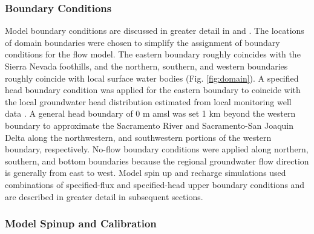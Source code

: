 \subsubsection{Boundary Conditions} \label{ssec:MM_BCs}
Model boundary conditions are discussed in greater detail in \cite{liu2014thesis} and \cite{maples_2019}. The locations of domain boundaries were chosen to simplify the assignment of boundary conditions for the flow model. The eastern boundary roughly coincides with the Sierra Nevada foothills, and the northern, southern, and western boundaries roughly coincide with local surface water bodies (Fig. \ref{fig:domain}). A specified head boundary condition was applied for the eastern boundary to coincide with the local groundwater head distribution estimated from local monitoring well data \citep{liu2014thesis}. A general head boundary of 0 m amsl was set 1 km beyond the western boundary to approximate the Sacramento River and Sacramento-San Joaquin Delta along the northwestern, and southwestern portions of the western boundary, respectively. No-flow boundary conditions were applied along northern, southern, and bottom boundaries because the regional groundwater flow direction is generally from east to west. Model spin up and recharge simulations used combinations of specified-flux and specified-head upper boundary conditions and are described in greater detail in subsequent sections.

\subsubsection{Model Spinup and Calibration} \label{sssec:MM_spinup}

